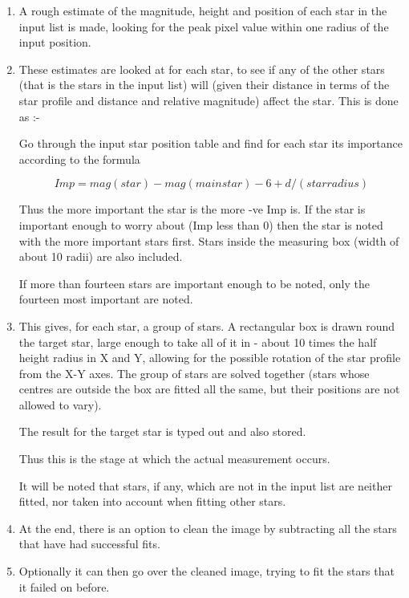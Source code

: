 \begin{small}
{{\begin{enumerate}
 \item A rough estimate of the magnitude, height and position of each star in
       the input list is made, looking for the peak pixel value within one
       radius of the input position.

 \item These estimates are looked at for each star, to see if any of the
       other stars (that is the stars in the input list) will
       (given their distance in terms of the star profile and distance
       and relative magnitude) affect the star. This is done as :-

   Go through the input star position table and find for each star its
   importance according to the formula

       $$ Imp = mag(star) - mag(main star) - 6 + d/(star radius) $$

   Thus the more important the star is the more -ve Imp is. If the
   star is important enough to worry about (Imp less than 0) then the star
   is noted with the more important stars first. Stars inside the
   measuring box (width of about 10 radii) are also included.

   If more than fourteen stars are important enough to be noted, only
   the fourteen most important are noted.

 \item This gives, for each star, a group of stars. A rectangular box is
    drawn round the target star, large enough to take all of it in -
    about 10 times the half height radius in X and Y, allowing for
    the possible rotation of the star profile from the X-Y axes.
    The group of stars are solved together (stars whose centres are
    outside the box are fitted all the same, but their positions are not
    allowed to vary).

   The result for the target star is typed out and also stored.

   Thus this is the stage at which the actual measurement occurs.

   It will be noted that stars, if any,  which are not in the input list
   are neither fitted, nor taken into account when fitting other stars.

 \item At the end, there is an option to clean the image by subtracting all
   the stars that have had successful fits.

 \item Optionally it can then go over the cleaned image, trying to fit the
    stars that it failed on before.


\end{enumerate}}}
\end{small}
